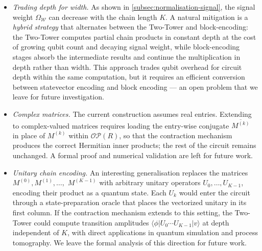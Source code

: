 \documentclass[a4paper,UKenglish,cleveref,autoref,thm-restate]{socg-lipics-v2021}
\providecommand{\ket}[1]{\lvert #1 \rangle}
\providecommand{\bra}[1]{\langle #1 \rvert}
\newcommand{\OP}{\mathcal{OP}}        %
\begin{document}
\begin{itemize}
\item \emph{Trading depth for width.}
As shown in \cref{subsec:normalisation-signal}, the signal weight $\Omega_{\mathcal{W}}$ can decrease with the chain length $K$. A natural mitigation is a \emph{hybrid strategy} that alternates between the Two-Tower and block-encoding: the Two-Tower computes partial chain products in constant depth at the cost of growing qubit count and decaying signal weight, while block-encoding stages absorb the intermediate results and continue the multiplication in depth rather than width. This approach trades qubit overhead for circuit depth within the same computation, but it requires an efficient conversion between statevector encoding and block encoding --- an open problem that we leave for future investigation.

\item \emph{Complex matrices.}
The current construction assumes real entries. Extending to complex-valued matrices requires loading the entry-wise conjugate $\overline{M^{(k)}}$ in place of $M^{(k)}$ within $\OP(R)$, so that the contraction mechanism produces the correct Hermitian inner products; the rest of the circuit remains unchanged. A formal proof and numerical validation are left for future work.

\item \emph{Unitary chain encoding.}
An interesting generalisation replaces the matrices $M^{(0)}, M^{(1)},\ldots,$ $ M^{(K-1)}$ with arbitrary unitary operators $U_0, \ldots, U_{K-1}$, encoding their product as a quantum state. Each $U_k$ would enter the circuit through a state-preparation oracle that places the vectorized unitary in its first column. If the contraction mechanism extends to this setting, the Two-Tower could compute transition amplitudes $\bra{\phi} U_0 \cdots U_{K-1} \ket{v}$ at depth independent of $K$, with direct applications in quantum simulation and process tomography. We leave the formal analysis of this direction for future work.
\end{itemize}


\end{document}

